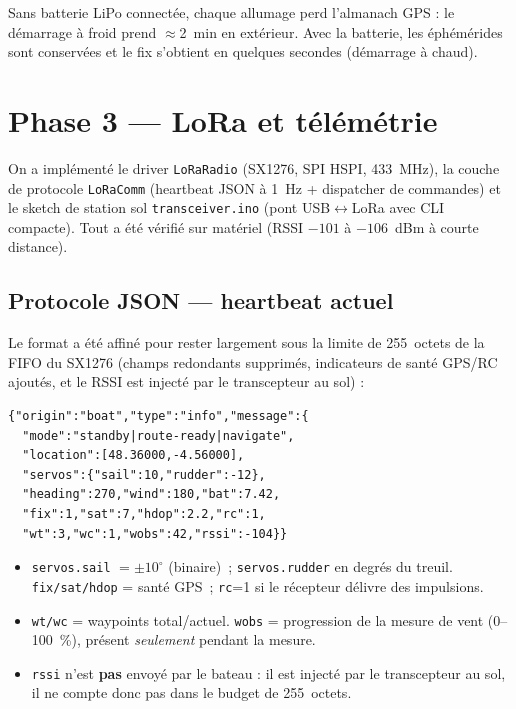\documentclass[12pt,a4paper]{article}
\newcommand{\file}[1]{\texttt{#1}}
\begin{document}
Sans batterie LiPo connect\'ee, chaque allumage perd l'almanach GPS : le d\'emarrage
à froid prend $\approx$2~min en ext\'erieur. Avec la batterie, les \'eph\'em\'erides
sont conserv\'ees et le fix s'obtient en quelques secondes (d\'emarrage à chaud).

\section{Phase 3 --- LoRa et t\'el\'em\'etrie}

On a impl\'ement\'e le driver \file{LoRaRadio} (SX1276, SPI HSPI, 433~MHz), la couche
de protocole \file{LoRaComm} (heartbeat JSON à 1~Hz + dispatcher de commandes) et le
sketch de station sol \file{transceiver.ino} (pont USB$\leftrightarrow$LoRa avec CLI
compacte). Tout a \'et\'e v\'erifi\'e sur mat\'eriel (RSSI $-101$ à $-106$~dBm à
courte distance).

\subsection{Protocole JSON --- heartbeat actuel}

Le format a \'et\'e affin\'e pour rester largement sous la limite de 255~octets de la
FIFO du SX1276 (champs redondants supprim\'es, indicateurs de sant\'e GPS/RC
ajout\'es, et le RSSI est inject\'e par le transcepteur au sol) :

\begin{lstlisting}[style=json, caption={Heartbeat drone -> sol (1 Hz)}]
{"origin":"boat","type":"info","message":{
  "mode":"standby|route-ready|navigate",
  "location":[48.36000,-4.56000],
  "servos":{"sail":10,"rudder":-12},
  "heading":270,"wind":180,"bat":7.42,
  "fix":1,"sat":7,"hdop":2.2,"rc":1,
  "wt":3,"wc":1,"wobs":42,"rssi":-104}}
\end{lstlisting}

\begin{itemize}
  \item \texttt{servos.sail} $=\pm10^{\circ}$ (binaire)~; \texttt{servos.rudder} en
    degr\'es du treuil. \texttt{fix/sat/hdop} = sant\'e GPS~; \texttt{rc}=1 si le
    r\'ecepteur d\'elivre des impulsions.
  \item \texttt{wt/wc} = waypoints total/actuel. \texttt{wobs} = progression de la
    mesure de vent (0--100~\%), pr\'esent \emph{seulement} pendant la mesure.
  \item \texttt{rssi} n'est \textbf{pas} envoy\'e par le bateau : il est inject\'e par
    le transcepteur au sol, il ne compte donc pas dans le budget de 255~octets.
\end{itemize}
\end{document}
